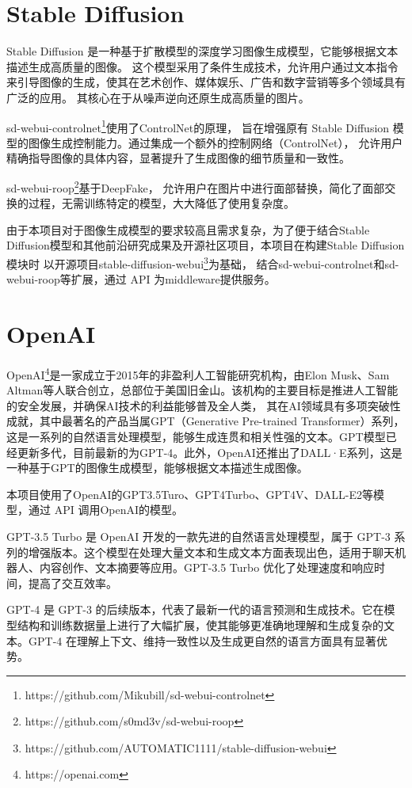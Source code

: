 \documentclass[a4paper,AutoFakeBold,oneside,12pt]{book}
\begin{document}
\section{Stable Diffusion}
Stable Diffusion 是一种基于扩散模型的深度学习图像生成模型，它能够根据文本描述生成高质量的图像。
这个模型采用了条件生成技术，允许用户通过文本指令来引导图像的生成，使其在艺术创作、媒体娱乐、广告和数字营销等多个领域具有广泛的应用。
其核心在于从噪声逆向还原生成高质量的图片。

sd-webui-controlnet\footnote{https://github.com/Mikubill/sd-webui-controlnet}使用了ControlNet\cite{zhang2023adding}的原理，
旨在增强原有 Stable Diffusion 模型的图像生成控制能力。通过集成一个额外的控制网络（ControlNet），
允许用户精确指导图像的具体内容，显著提升了生成图像的细节质量和一致性。

sd-webui-roop\footnote{https://github.com/s0md3v/sd-webui-roop}基于DeepFake\cite{van2021deepfake}，
允许用户在图片中进行面部替换，简化了面部交换的过程，无需训练特定的模型，大大降低了使用复杂度。

由于本项目对于图像生成模型的要求较高且需求复杂，为了便于结合Stable Diffusion模型和其他前沿研究成果及开源社区项目，本项目在构建Stable Diffusion模块时
以开源项目stable-diffusion-webui\footnote{https://github.com/AUTOMATIC1111/stable-diffusion-webui}为基础，
结合sd-webui-controlnet和sd-webui-roop等扩展，通过 API 为middleware提供服务。

\section{OpenAI}
OpenAI\footnote{https://openai.com}是一家成立于2015年的非盈利人工智能研究机构，由Elon Musk、Sam Altman等人联合创立，总部位于美国旧金山。该机构的主要目标是推进人工智能的安全发展，并确保AI技术的利益能够普及全人类，
其在AI领域具有多项突破性成就，其中最著名的产品当属GPT（Generative Pre-trained Transformer）系列，这是一系列的自然语言处理模型，能够生成连贯和相关性强的文本。GPT模型已经更新多代，目前最新的为GPT-4。此外，OpenAI还推出了DALL·E系列，这是一种基于GPT的图像生成模型，能够根据文本描述生成图像。

本项目使用了OpenAI的GPT3.5Turo、GPT4Turbo、GPT4V、DALL-E2等模型，通过 API 调用OpenAI的模型。

GPT-3.5 Turbo 是 OpenAI 开发的一款先进的自然语言处理模型，属于 GPT-3 系列的增强版本。这个模型在处理大量文本和生成文本方面表现出色，适用于聊天机器人、内容创作、文本摘要等应用。GPT-3.5 Turbo 优化了处理速度和响应时间，提高了交互效率。

GPT-4\cite{achiam2023gpt} 是 GPT-3 的后续版本，代表了最新一代的语言预测和生成技术。它在模型结构和训练数据量上进行了大幅扩展，使其能够更准确地理解和生成复杂的文本。GPT-4 在理解上下文、维持一致性以及生成更自然的语言方面具有显著优势。
\end{document}
